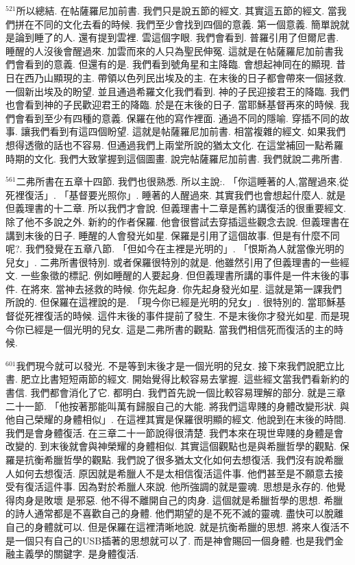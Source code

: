 \documentclass{book}
\begin{document}
$^{521}$所以總結.
在帖薩羅尼加前書.
我們只是說五節的經文.
其實這五節的經文.
當我們拼在不同的文化去看的時候.
我們至少會找到四個的意義.
第一個意義.
簡單說就是論到睡了的人.
還有提到雲裡.
雲這個字眼.
我們會看到.
普羅引用了但爾尼書.
睡醒的人沒後會醒過來.
加雲而來的人只為聖民伸冤.
這就是在帖薩羅尼加前書我們會看到的意義.
但還有的是.
我們看到號角星和主降臨.
會想起神同在的顯現.
昔日在西乃山顯現的主.
帶領以色列民出埃及的主.
在末後的日子都會帶來一個拯救.
一個新出埃及的盼望.
並且通過希羅文化我們看到.
神的子民迎接君王的降臨.
我們也會看到神的子民歡迎君王的降臨.
於是在末後的日子.
當耶穌基督再來的時候.
我們會看到至少有四種的意義.
保羅在他的寫作裡面.
通過不同的隱喻.
穿插不同的故事.
讓我們看到有這四個盼望.
這就是帖薩羅尼加前書.
相當複雜的經文.
如果我們想得透徹的話也不容易.
但通過我們上兩堂所說的猶太文化.
在這堂補回一點希羅時期的文化.
我們大致掌握到這個圖畫.
說完帖薩羅尼加前書.
我們就說二弗所書.

$^{561}$二弗所書在五章十四節.
我們也很熟悉.
所以主說:.
「你這睡著的人,當醒過來,從死裡復活」.
「基督要光照你」.
睡著的人醒過來.
其實我們也會想起什麼人.
就是但義理書的十二章.
所以我們才會說.
但義理書十二章是舊約講復活的很重要經文.
除了他不多說之外.
新約的作者保羅.
他會很嘗試去穿插這些觀念去說.
但義理書在講到末後的日子.
睡醒的人會發光如星.
保羅是引用了這個故事.
但是有什麼不同呢?.
我們發覺在五章八節.
「但如今在主裡是光明的」.
「恨斯為人就當像光明的兒女」.
二弗所書很特別.
或者保羅很特別的就是.
他雖然引用了但義理書的一些經文.
一些象徵的標記.
例如睡醒的人要起身.
但但義理書所講的事件是一件末後的事件.
在將來.
當神去拯救的時候.
你先起身.
你先起身發光如星.
這就是第一課我們所說的.
但保羅在這裡說的是.
「現今你已經是光明的兒女」.
很特別的.
當耶穌基督從死裡復活的時候.
這件末後的事件提前了發生.
不是末後你才發光如星.
而是現今你已經是一個光明的兒女.
這是二弗所書的觀點.
當我們相信死而復活的主的時候.

$^{601}$我們現今就可以發光.
不是等到末後才是一個光明的兒女.
接下來我們說肥立比書.
肥立比書短短兩節的經文.
開始覺得比較容易去掌握.
這些經文當我們看新約的書信.
我們都會消化了它.
都明白.
我們首先說一個比較容易理解的部分.
就是三章二十一節.
「他按著那能叫萬有歸服自己的大能.
將我們這卑賤的身體改變形狀.
與他自己榮耀的身體相似」.
在這裡其實是保羅很明顯的經文.
他說到在末後的時間.
我們是會身體復活.
在三章二十一節說得很清楚.
我們本來在現世卑賤的身體是會改變的.
到末後就會與神榮耀的身體相似.
其實這個觀點也是與希臘哲學的觀點.
保羅是抗衡希臘哲學的觀點.
我們說了很多猶太文化如何去想復活.
我們沒有說希臘人如何去想復活.
原因就是希臘人不是太相信復活這件事.
他們甚至是不願意去接受有復活這件事.
因為對於希臘人來說.
他所強調的就是靈魂.
思想是永存的.
他覺得肉身是敗壞 是邪惡.
他不得不離開自己的肉身.
這個就是希臘哲學的思想.
希臘的詩人通常都是不喜歡自己的身體.
他們期望的是不死不滅的靈魂.
盡快可以脫離自己的身體就可以.
但是保羅在這裡清晰地說.
就是抗衡希臘的思想.
將來人復活不是一個只有自己的USB插著的思想就可以了.
而是神會賜回一個身體.
也是我們金融主義學的關鍵字.
是身體復活.
\end{document}

